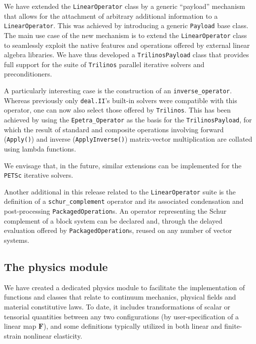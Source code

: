 \documentclass{ansarticle-preprint}
\newcommand{\specialword}[1]{\texttt{#1}}
\newcommand{\dealii}{{\specialword{deal.II}}}
\newcommand{\trilinos}{{\specialword{Trilinos}}}
\newcommand{\petsc}{\specialword{PETSc}}
\begin{document}
We have extended the \texttt{LinearOperator} class by a generic
``payload'' mechanism that allows for the attachment of arbitrary additional
information to a \texttt{LinearOperator}. This was achieved by introducing
a generic \texttt{Payload} base class. The main use case of the new
mechanism is to extend the \texttt{LinearOperator} class to seamlessly
exploit the native features and operations offered by external linear
algebra libraries. We have thus developed a \texttt{TrilinosPayload} class
that provides full support for the suite of {\trilinos} parallel iterative
solvers and preconditioners.

A particularly interesting case is the construction of an
\texttt{inverse\_operator}. Whereas previously only \dealii's built-in solvers
were compatible with this operator, one can now also select those
offered by {\trilinos}. This has been achieved by using
the \texttt{Epetra\_Operator} as the basis for the
\texttt{TrilinosPayload}, for which the result of standard and composite
operations involving forward (\texttt{Apply()}) and inverse
(\texttt{ApplyInverse()}) matrix-vector multiplication are collated using
lambda functions.

We envisage that, in the future, similar extensions can be implemented for the {\petsc}
iterative solvers.

Another additional in this release related to the \texttt{LinearOperator} suite is the definition
of a \texttt{schur\_complement} operator and its associated condensation
and post-processing \texttt{PackagedOperation}s. An operator representing
the Schur complement of a block system can be declared and, through the
delayed evaluation offered by \texttt{PackagedOperation}s, reused on any
number of vector systems.

\subsection{The physics module}
\label{sec:physics}

We have created a dedicated physics module to facilitate the
implementation of functions and classes that relate to continuum mechanics,
physical fields and material constitutive laws. To date, it includes
transformations of scalar or tensorial quantities between any two
configurations (by user-specification of a linear map $\mathbf{F}$), and some 
definitions typically utilized in both linear and finite-strain nonlinear 
elasticity.
\end{document}
